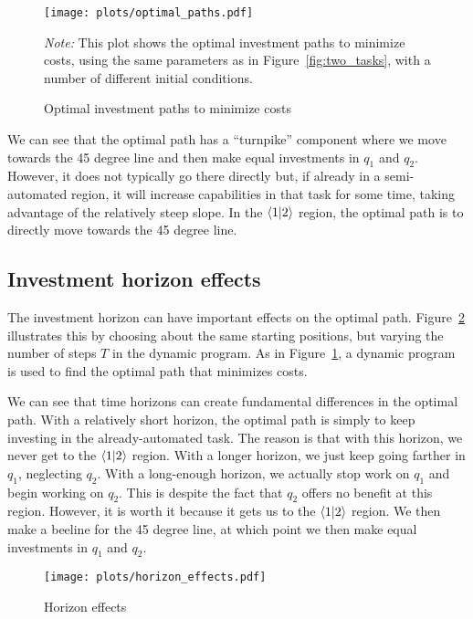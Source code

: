 \documentclass{article}
\theoremstyle{plain}
\theoremstyle{plain}
\begin{document}
\begin{figure}
  \begin{center}
  \caption{Optimal investment paths to minimize costs} \label{fig:optimal_paths}
  \texttt{[image: plots/optimal\_paths.pdf]}
  \end{center}
  \begin{footnotesize}
  \emph{Note:} This plot shows the optimal investment paths to minimize costs, using the same parameters as in Figure~\ref{fig:two_tasks}, with a number of different initial conditions.
\end{footnotesize}
\end{figure}

We can see that the optimal path has a ``turnpike'' component where we move towards the 45 degree line and then make equal investments in \(q_1\) and \(q_2\).
However, it does not typically go there directly but, if already in a semi-automated region, it will increase capabilities in that task for some time, taking advantage of the relatively steep slope. 
In the \(\langle 1|2 \rangle\) region, the optimal path is to directly move towards the 45 degree line.

\subsection{Investment horizon effects}
The investment horizon can have important effects on the optimal path.
Figure~\ref{fig:horizon_effects} illustrates this by choosing about the same starting positions, but varying the number of steps \(T\) in the dynamic program.
As in Figure~\ref{fig:optimal_paths}, a dynamic program is used to find the optimal path that minimizes costs.

We can see that time horizons can create fundamental differences in the optimal path.
With a relatively short horizon, the optimal path is simply to keep investing in the already-automated task.
The reason is that with this horizon, we never get to the \(\langle 1|2 \rangle\) region.
With a longer horizon, we just keep going farther in \(q_1\), neglecting \(q_2\).
With a long-enough horizon, we actually stop work on \(q_1\) and begin working on \(q_2\).
This is despite the fact that \(q_2\) offers no benefit at this region.
However, it is worth it because it gets us to the \(\langle 1|2 \rangle\) region.
We then make a beeline for the 45 degree line, at which point we then make equal investments in \(q_1\) and \(q_2\).

\begin{figure}
  \begin{center}
  \caption{Horizon effects} \label{fig:horizon_effects}
  \texttt{[image: plots/horizon\_effects.pdf]}
  \end{center}
\end{figure}
\end{document}
